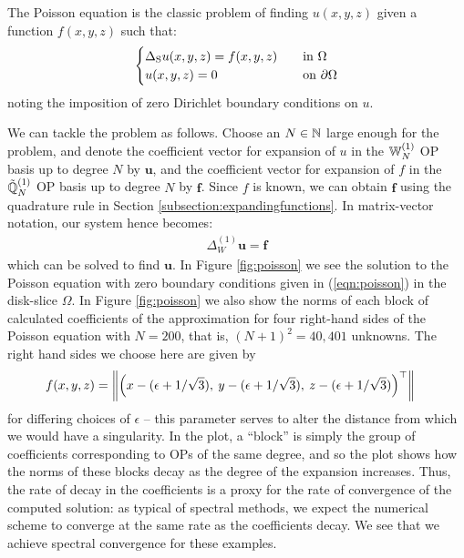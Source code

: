 \documentclass[11pt, oneside]{article}   	%
\begin{document}
The Poisson equation is the classic problem of finding $u(x,y,z)$ given a function $f(x,y,z)$ such that:
\begin{align}
	\begin{cases}
\Delta_{\rm S} u(x,y,z) = f(x,y,z) &\quad \text{in } \Omega \\
		u(x,y,z) = 0& \quad \text{on } \partial \Omega
	\end{cases}
	\label{eqn:poisson}
\end{align}
noting the imposition of zero Dirichlet boundary conditions on $u$.

We can tackle the problem as follows. Choose an $N \in \mathbb{N}$ large enough for the problem, and denote the coefficient vector for expansion of $u$ in the $\mathbb{W}_N^{(1)}$ OP basis up to degree $N$ by $\mathbf{u}$, and the coefficient vector for expansion of $f$ in the ${\mathbb{\tilde Q}}^{(1)}_{N}$ OP basis up to degree $N$ by $\mathbf{f}$. Since $f$ is known, we can obtain $\mathbf{f}$ using the quadrature rule in Section \ref{subsection:expandingfunctions}. In matrix-vector notation, our system hence becomes:
\begin{align*}
    \Delta_W^{(1)} \mathbf{u} = \mathbf{f}
\end{align*}
which can be solved to find $\mathbf{u}$.
In Figure \ref{fig:poisson} we see the solution to the Poisson equation with zero boundary conditions given in (\ref{eqn:poisson}) in the disk-slice $\Omega$. In Figure \ref{fig:poisson} we also show the norms of each block of calculated coefficients of the approximation for four right-hand sides of the Poisson equation with $N = 200$, that is, $(N+1)^2 = 40,401$ unknowns. The right hand sides we choose here are given by
\begin{align*}
	f(x,y,z) &= \left\| \Big(x - (\epsilon + 1 / \sqrt{3}), \: y - (\epsilon + 1 / \sqrt{3}), \: z - (\epsilon + 1 / \sqrt{3})\Big)^\top \right\|
\end{align*}
for differing choices of $\epsilon$ -- this parameter serves to alter the distance from which we would have a singularity. In the plot, a \enquote{block} is simply the group of coefficients corresponding to OPs of the same degree, and so the plot shows how the norms of these blocks decay as the degree of the expansion increases. Thus, the rate of decay in the coefficients is a proxy for the rate of convergence of the computed solution: as typical of spectral methods, we expect the numerical scheme to converge at the same rate as the coefficients decay. We see that we achieve spectral convergence for these examples.
\end{document}
